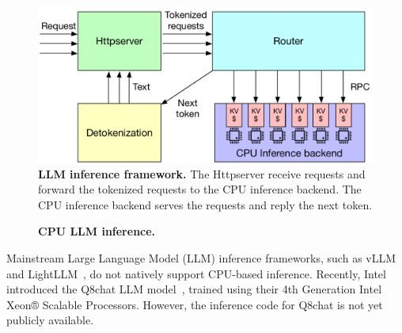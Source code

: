 \begin{figure}[t]
\centering
 \includegraphics[width=\columnwidth]{fig/cxl/llm.pdf}
  \caption[LLM inference framework]{\textbf{LLM inference framework.} The Httpserver receive requests and forward the tokenized requests to the CPU inference backend. The CPU inference backend serves the requests and reply the next token.}
\label{fig:llm-framework}
\end{figure}

\begin{figure}[h!]
\centering
{}
\caption[CPU LLM inference]{\textbf{CPU LLM inference.} }
\end{figure}
Mainstream Large Language Model (LLM) inference frameworks, such as vLLM~\cite{vllm} and LightLLM~\cite{lightllm}, do not natively support CPU-based inference. Recently, Intel introduced the Q8chat LLM model~\cite{q8chat}, trained using their 4th Generation Intel Xeon® Scalable Processors. However, the inference code for Q8chat is not yet publicly available. 

